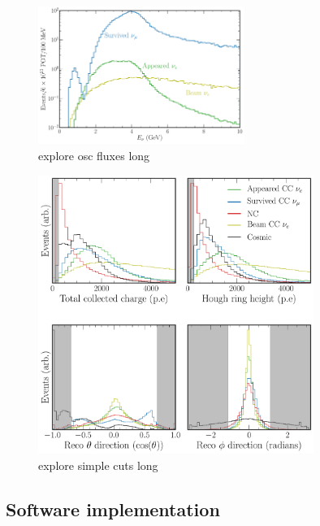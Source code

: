 \begin{figure} %
    \includegraphics[width=0.6\textwidth]{diagrams/7-cvn/chipsnet/explore_osc_fluxes.pdf}
    \caption[explore osc fluxes short]
    {explore osc fluxes long}
    \label{fig:explore_osc_fluxes}
\end{figure}

\begin{figure} %
    \includegraphics[width=0.8\textwidth]{diagrams/7-cvn/chipsnet/explore_simple_cuts.pdf}
    \caption[explore simple cuts short]
    {explore simple cuts long}
    \label{fig:explore_simple_cuts}
\end{figure}

\subsection{Software implementation} %
\label{sec:cvn_baseline_soft} %

